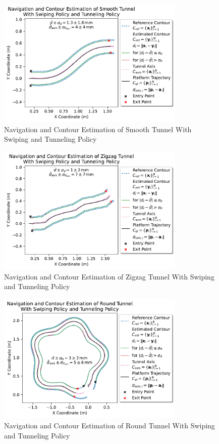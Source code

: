 \begin{figure}[htb]
    \centering
    \includegraphics[width=0.8\textwidth]{figures/experiments/smooth-tunnel-swiping-tunneling}
    \caption{Navigation and Contour Estimation of Smooth Tunnel With Swiping and Tunneling Policy}
    \label{fig:experiment-smooth-tunnel-swiping-tunneling}
\end{figure}
\begin{figure}[htb]
    \centering
    \includegraphics[width=0.8\textwidth]{figures/experiments/zigzag-tunnel-swiping-tunneling}
    \caption{Navigation and Contour Estimation of Zigzag Tunnel With Swiping and Tunneling Policy}
    \label{fig:experiment-zigzag-tunnel-swiping-tunneling}
\end{figure}
\begin{figure}[htb]
    \centering
    \includegraphics[width=0.8\textwidth]{figures/experiments/round-tunnel-swiping-tunneling}
    \caption{Navigation and Contour Estimation of Round Tunnel With Swiping and Tunneling Policy}
    \label{fig:experiment-round-tunnel-swiping-tunneling}
\end{figure}
